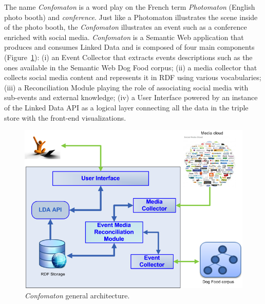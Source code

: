 The name \emph{Confomaton} is a word play on the French term \emph{Photomaton} (English photo booth) and \emph{conference}. Just like a Photomaton illustrates the scene inside of the photo booth, the \emph{Confomaton} illustrates an event such as a conference enriched with social media. \emph{Confomaton} is a Semantic Web application that produces and consumes Linked Data and is composed of four main components (Figure~\ref{fig:architecture}): (i) an Event Collector that extracts events descriptions such as the ones available in the Semantic Web Dog Food corpus; (ii) a media collector that collects social media content and represents it in RDF using various vocabularies; (iii) a Reconciliation Module playing the role of associating social media with sub-events and external knowledge; (iv) a User Interface powered by an instance of the Linked Data API as a logical layer connecting all the data in the triple store with the front-end visualizations.

\begin{figure}[t!h]
 \centering
 \includegraphics[scale=0.35]{img/architecture.png}
 \caption{\emph{Confomaton} general architecture.}
 \label{fig:architecture}
\end{figure}



